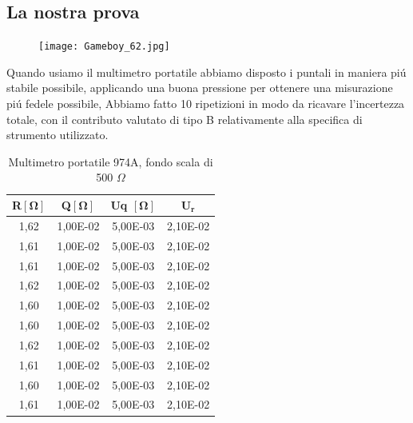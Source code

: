 \subsection*{La nostra prova}
\label{sub:nosta_prova_first}


\vspace{0.5cm}
\FloatBarrier
\begin{figure}[h]
    \centering
    \texttt{[image: Gameboy\_62.jpg]}
    \label{fig:mult_port_nostro}
\end{figure}
\FloatBarrier
    

Quando usiamo il multimetro portatile abbiamo disposto i puntali in maniera pi\'u stabile possibile, applicando una buona pressione per ottenere una misurazione pi\'u fedele possibile,
Abbiamo fatto 10 ripetizioni in modo da ricavare l'incertezza totale, con il contributo valutato di tipo B relativamente alla specifica di strumento utilizzato.

\begin{table}[!ht]
    \centering
    \begin{tabular}{|c|c|c|c|}
    \hline
        \textbf{R}$\bm{[\Omega]}$ & \textbf{Q}$\bm{[\Omega]}$ & \textbf{Uq} $\bm{[\Omega]}$ & $\bm{U_r}$ \\ \hline
        1,62 & 1,00E-02 & 5,00E-03 & 2,10E-02 \\ \hline
        1,61 & 1,00E-02 & 5,00E-03 & 2,10E-02 \\ \hline
        1,61 & 1,00E-02 & 5,00E-03 & 2,10E-02 \\ \hline
        1,62 & 1,00E-02 & 5,00E-03 & 2,10E-02 \\ \hline
        1,60 & 1,00E-02 & 5,00E-03 & 2,10E-02 \\ \hline
        1,60 & 1,00E-02 & 5,00E-03 & 2,10E-02 \\ \hline
        1,62 & 1,00E-02 & 5,00E-03 & 2,10E-02 \\ \hline
        1,61 & 1,00E-02 & 5,00E-03 & 2,10E-02 \\ \hline
        1,60 & 1,00E-02 & 5,00E-03 & 2,10E-02 \\ \hline
        1,61 & 1,00E-02 & 5,00E-03 & 2,10E-02 \\ \hline
    \end{tabular}
    \caption{Multimetro portatile 974A, fondo scala di 500 $\Omega$}
    \label{tab:mult_port}
\end{table}
\FloatBarrier

